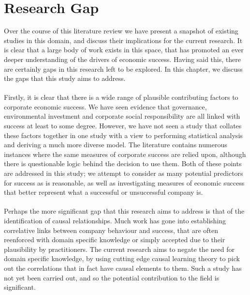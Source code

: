 {\section{Research Gap}
{Over the course of this literature review we have present a snapshot of existing studies in this domain, and discuss their implications for the current research. It is clear that a large body of work exists in this space, that has promoted an ever deeper understanding of the drivers of economic success. Having said this, there are certainly gaps in this research left to be explored. In this chapter, we discuss the gaps that this study aims to address. \\\\
Firstly, it is clear that there is a wide range of plausible contributing factors to corporate economic success. We have seen evidence that governance, environmental investment and corporate social responsibility are all linked with success at least to some degree. However, we have not seen a study that collates these factors together in one study with a view to performing statistical analysis and deriving a much more diverse model. The literature contains numerous instances where the same measures of corporate success are relied upon, although there is questionable logic behind the decision to use them. Both of these points are addressed in this study; we attempt to consider as many potential predictors for success as is reasonable, as well as investigating measures of economic success that better represent what a successful or unsuccessful company is.\\\\
Perhaps the more significant gap that this research aims to address is that of the identification of causal relationships. Much work has gone into establishing correlative links between company behaviour and success, that are often reenforced with domain specific knowledge or simply accepted due to their plausibility by practitioners. The current research aims to negate the need for domain specific knowledge, by using cutting edge causal learning theory to pick out the correlations that in fact have causal elements to them. Such a study has not yet been carried out, and so the potential contribution to the field is significant.}


}